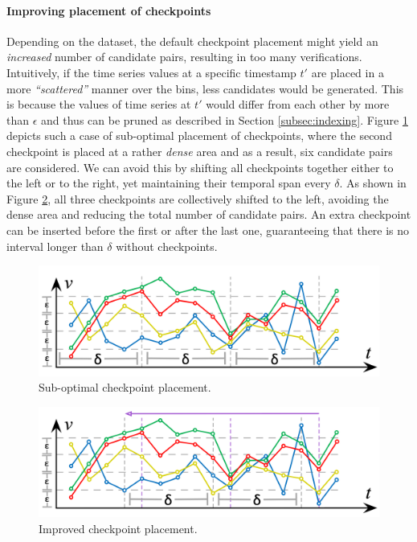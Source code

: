 \paragraph{Improving placement of checkpoints} Depending on the dataset, the default checkpoint placement might yield an \textit{increased} number of candidate pairs, resulting in too many verifications. Intuitively, if the time series values at a specific timestamp $t'$ are placed in a more \textit{``scattered''} manner over the bins, less candidates would be generated. This is because the values of time series at $t'$ would differ from each other by more than $\epsilon$ and thus can be pruned as described in Section \ref{subsec:indexing}. Figure \ref{fig:opt1} depicts such a case of sub-optimal placement of checkpoints, where the second checkpoint is placed at a rather \textit{dense} area and as a result, six candidate pairs are considered. We can avoid this by shifting all checkpoints together either to the left or to the right, yet maintaining their temporal span every $\delta$. As shown in Figure \ref{fig:opt2}, all three checkpoints are collectively shifted to the left, avoiding the dense area and reducing the total number of candidate pairs. An extra checkpoint can be inserted before the first or after the last one, guaranteeing that there is no interval longer than $\delta$ without checkpoints.


\begin{figure}[tb]
    \centering
    \includegraphics{figures/sub_opt.png}
    \caption{Sub-optimal checkpoint placement.}
    \label{fig:opt1}
\end{figure}

\begin{figure}[tb]
    \centering
    \includegraphics{figures/opt.png}
    \caption{Improved checkpoint placement.}
    \label{fig:opt2}
\end{figure}

